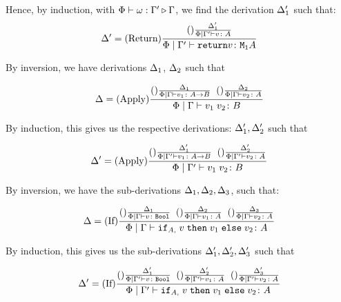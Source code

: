 {    Hence, by induction, with $\Phi\vdash \omega : \Gamma' \triangleright \Gamma$, we find the derivation $\Delta_1'$ such that:
    \begin{equation}
        \Delta' = (\text{Return}) \frac{(\text{}) \frac{\Delta_1'}{\Phi\mid\Gamma' \vdash v \colon A}}{\Phi\mid\Gamma' \vdash \texttt{return} v \colon \texttt{M}_{\texttt{1}}{A}}
    \end{equation}

        By inversion, we have derivations $\Delta_1$, $\Delta_2$ such that

        \begin{equation}
            \Delta = 
            (\text{Apply}) \frac{
                (\text{}) \frac{\Delta_1}{\Phi\mid\Gamma \vdash v_1 \colon A\rightarrow B}
                \;\;
                (\text{}) \frac{\Delta_2}{\Phi\mid\Gamma \vdash v_2 \colon A}
            }{
                \Phi\mid\Gamma \vdash v_1\; v_2 \colon B
            }
        \end{equation}

        By induction, this gives us the respective derivations: $\Delta_1',\Delta_2'$ such that

        
        \begin{equation}
            \Delta' = 
            (\text{Apply}) \frac{
                (\text{}) \frac{\Delta_1'}{\Phi\mid\Gamma' \vdash v_1 \colon A\rightarrow B}
                \;\;
                (\text{}) \frac{\Delta_2'}{\Phi\mid\Gamma' \vdash v_2 \colon A}
            }{
                \Phi\mid\Gamma' \vdash v_1\; v_2 \colon B
            }
        \end{equation}

    By inversion, we have the sub-derivations $\Delta_1,\Delta_2,\Delta_3$, such that:


    \begin{equation}
        \Delta = (\text{If}) \frac{
            (\text{}) \frac{\Delta_1}{\Phi\mid\Gamma \vdash v \colon \texttt{Bool}}
            \;\;
            (\text{}) \frac{\Delta_2}{\Phi\mid\Gamma \vdash v_1 \colon A}
            \;\;
            (\text{}) \frac{\Delta_3}{\Phi\mid\Gamma \vdash v_2 \colon A}
        }{
            \Phi\mid\Gamma \vdash \texttt{if}_{A, }\; v\; \texttt{then}\; v_1 \;\texttt{else} \; v_2 \colon A
        }
    \end{equation}

    By induction, this gives us the sub-derivations $\Delta_1', \Delta_2', \Delta_3'$ such that

    \begin{equation}
        \Delta' = (\text{If}) \frac{
            (\text{}) \frac{\Delta_1'}{\Phi\mid\Gamma' \vdash v \colon \texttt{Bool}}
            \;\;
            (\text{}) \frac{\Delta_2'}{\Phi\mid\Gamma' \vdash v_1 \colon A}
            \;\;
            (\text{}) \frac{\Delta_3'}{\Phi\mid\Gamma' \vdash v_2 \colon A}
        }{
            \Phi\mid\Gamma' \vdash \texttt{if}_{A, }\; v\; \texttt{then}\; v_1 \;\texttt{else} \; v_2 \colon A
        }
    \end{equation}
   
}

